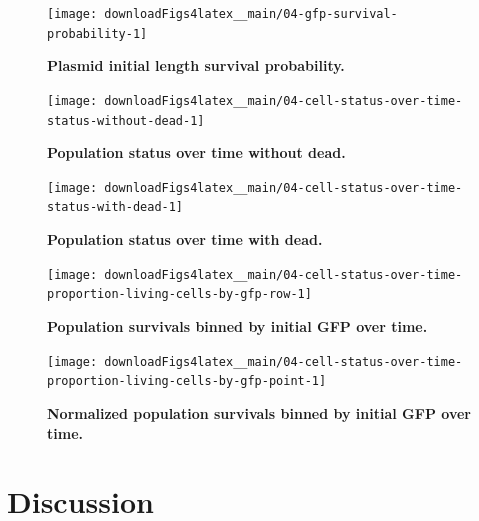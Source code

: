 \documentclass[a4paper, nobind]{templates/ociamthesis}
\begin{document}
\begin{figure}[H]
\texttt{[image: downloadFigs4latex\_\_main/04-gfp-survival-probability-1]} \caption[Plasmid initial length survival probability.]{\textbf{Plasmid initial length survival probability.}}\label{fig:04-gfp-survival-probability-1}
\end{figure}





\begin{figure}[H]
\texttt{[image: downloadFigs4latex\_\_main/04-cell-status-over-time-status-without-dead-1]} \caption[Population status over time without dead.]{\textbf{Population status over time without dead.}}\label{fig:04-cell-status-over-time-status-without-dead-1}
\end{figure}





\begin{figure}[H]
\texttt{[image: downloadFigs4latex\_\_main/04-cell-status-over-time-status-with-dead-1]} \caption[Population status over time with dead.]{\textbf{Population status over time with dead.}}\label{fig:04-cell-status-over-time-status-with-dead-1}
\end{figure}





\begin{figure}[H]
\texttt{[image: downloadFigs4latex\_\_main/04-cell-status-over-time-proportion-living-cells-by-gfp-row-1]} \caption[Population survivals binned by initial GFP over time.]{\textbf{Population survivals binned by initial GFP over time.}}\label{fig:04-cell-status-over-time-proportion-living-cells-by-gfp-row-1}
\end{figure}





\begin{figure}[H]
\texttt{[image: downloadFigs4latex\_\_main/04-cell-status-over-time-proportion-living-cells-by-gfp-point-1]} \caption[Normalized population survivals binned by initial GFP over time.]{\textbf{Normalized population survivals binned by initial GFP over time.}}\label{fig:04-cell-status-over-time-proportion-living-cells-by-gfp-point-1}
\end{figure}

\hypertarget{discussion}{%
\section{Discussion}\label{discussion}}
\end{document}
